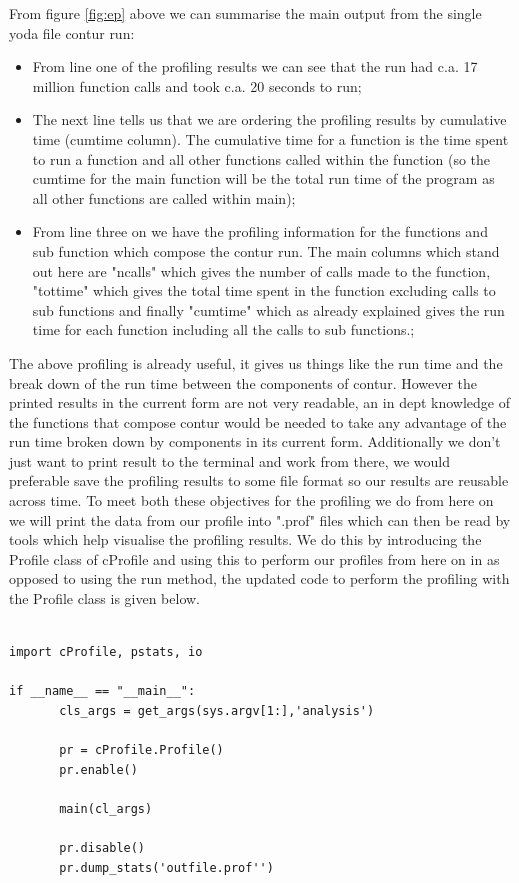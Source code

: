 From figure \ref{fig:ep} above we can summarise the main output from the single yoda file contur run:

\begin{itemize}
\item From line one of the profiling results we can see that the run had c.a. 17 million function calls and took c.a. 20 seconds to run;
\item The next line tells us that we are ordering the profiling results by cumulative time (cumtime column). The cumulative time for a function is the time spent to run a function and all other functions called within the function (so the cumtime for the main function will be the total run time of the program as all other functions are called within main);
\item From line three on we have the profiling information for the functions and sub function which compose the contur run. The main columns which stand out here are "ncalls" which gives the number of calls made to the function, "tottime" which gives the total time spent in the function excluding calls to sub functions and finally "cumtime" which as already explained gives the run time for each function including all the calls to sub functions.;
\end{itemize}

The above profiling is already useful, it gives us things like the run time and the break down of the run time between the components of contur. However the printed results in the current form are not very readable, an in dept knowledge of the functions that compose contur would be needed to take any advantage of the run time broken down by components in its current form. Additionally we don't just want to print result to the terminal and work from there, we would preferable save the profiling results to some file format so our results are reusable across time. To meet both these objectives for the profiling we do from here on we will print the data from our profile into ".prof" files which can then be read by tools which help visualise the profiling results. We do this by introducing the Profile class of cProfile and using this to perform our profiles from here on in as opposed to using the run method, the updated code to perform the profiling with the Profile class is given below.

\begin{verbatim}

import cProfile, pstats, io

if __name__ == "__main__":
       cls_args = get_args(sys.argv[1:],'analysis')
       
       pr = cProfile.Profile()
       pr.enable()
       
       main(cl_args)
       
       pr.disable()
       pr.dump_stats('outfile.prof'')
\end{verbatim}


